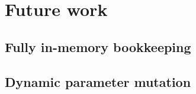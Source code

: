 
\chapter{Future work}\label{chapter:future_work}

\section{Fully in-memory bookkeeping}

\section{Dynamic parameter mutation}
